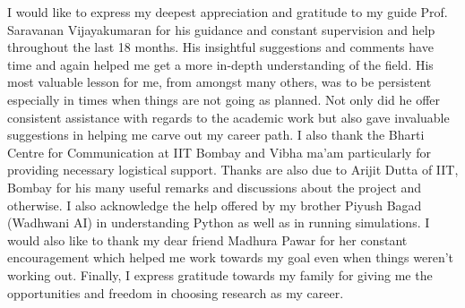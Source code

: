 \acknowledgments

I would like to express my deepest appreciation and gratitude to my guide Prof.
Saravanan Vijayakumaran for his guidance and constant supervision and help throughout the last 18 months. 
His insightful suggestions and comments have time and again helped me get a more in-depth understanding of the field.
His most valuable lesson for me, from amongst many others, was to be persistent especially in times when things are not going as planned. 
Not only did he offer consistent assistance with regards to the academic work but also gave invaluable suggestions in helping me carve out my career path. 
I also thank the Bharti Centre for Communication at IIT Bombay and Vibha ma'am particularly for providing necessary logistical support.
Thanks are also due to Arijit Dutta of IIT, Bombay for his many useful remarks and discussions about the project and otherwise. 
I also acknowledge the help offered by my brother Piyush Bagad (Wadhwani AI) in understanding Python as well as in running simulations. 
I would also like to thank my dear friend Madhura Pawar for her constant encouragement
which helped me work towards my goal even when things weren't working out.
Finally, I express gratitude towards my family for giving me the opportunities and freedom in choosing research as my career.





\signature{24 June 2020}


